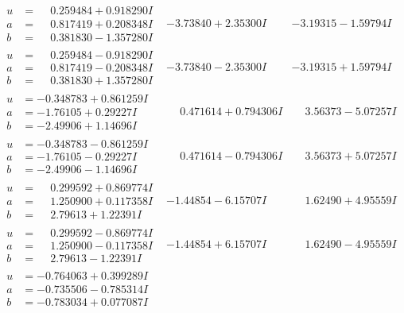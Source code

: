 \documentclass[1p]{elsarticle_modified}
\theoremstyle{definition}
\begin{document}
$$\begin{array}{c|c|c}
\begin{aligned}
u &= \phantom{-}0.259484 + 0.918290 I \\
a &= \phantom{-}0.817419 + 0.208348 I \\
b &= \phantom{-}0.381830 - 1.357280 I\end{aligned}
 & -3.73840 + 2.35300 I & -3.19315 - 1.59794 I \\ \hline\begin{aligned}
u &= \phantom{-}0.259484 - 0.918290 I \\
a &= \phantom{-}0.817419 - 0.208348 I \\
b &= \phantom{-}0.381830 + 1.357280 I\end{aligned}
 & -3.73840 - 2.35300 I & -3.19315 + 1.59794 I \\ \hline\begin{aligned}
u &= -0.348783 + 0.861259 I \\
a &= -1.76105 + 0.29227 I \\
b &= -2.49906 + 1.14696 I\end{aligned}
 & \phantom{-}0.471614 + 0.794306 I & \phantom{-}3.56373 - 5.07257 I \\ \hline\begin{aligned}
u &= -0.348783 - 0.861259 I \\
a &= -1.76105 - 0.29227 I \\
b &= -2.49906 - 1.14696 I\end{aligned}
 & \phantom{-}0.471614 - 0.794306 I & \phantom{-}3.56373 + 5.07257 I \\ \hline\begin{aligned}
u &= \phantom{-}0.299592 + 0.869774 I \\
a &= \phantom{-}1.250900 + 0.117358 I \\
b &= \phantom{-}2.79613 + 1.22391 I\end{aligned}
 & -1.44854 - 6.15707 I & \phantom{-}1.62490 + 4.95559 I \\ \hline\begin{aligned}
u &= \phantom{-}0.299592 - 0.869774 I \\
a &= \phantom{-}1.250900 - 0.117358 I \\
b &= \phantom{-}2.79613 - 1.22391 I\end{aligned}
 & -1.44854 + 6.15707 I & \phantom{-}1.62490 - 4.95559 I \\ \hline\begin{aligned}
u &= -0.764063 + 0.399289 I \\
a &= -0.735506 - 0.785314 I \\
b &= -0.783034 + 0.077087 I\end{aligned}

\end{array}$$
\end{document}
